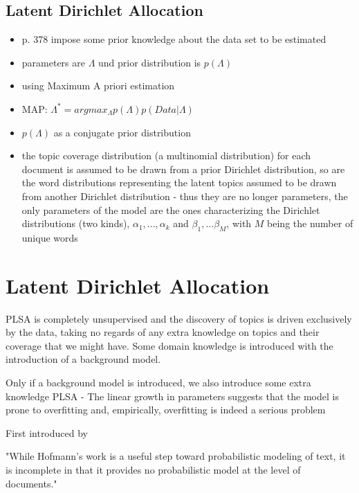\documentclass[11pt,a4paper,english,oneside]{book}
\numberwithin{equation}{chapter}
\begin{document}
\subsection{Latent Dirichlet Allocation}\label{LDA}

\begin{itemize}
	\item p. 378 impose some prior knowledge about the data set to be estimated
	\item parameters are $\Lambda$ und prior distribution is $p(\Lambda)$
	\item using Maximum A priori estimation
	\item MAP: $\Lambda^* = arg max_{\Lambda}p(\Lambda)p(Data|\Lambda)$
	\item $p(\Lambda)$ as a conjugate prior distribution
	\item the topic coverage distribution (a multinomial distribution) for each document is assumed to be drawn from a prior Dirichlet distribution, so are the word distributions representing the latent topics assumed to be drawn from another Dirichlet distribution - thus they are no longer parameters, the only parameters of the model are the ones characterizing the Dirichlet distributions (two kinds), $\alpha_1, ... , \alpha_k$ and $\beta_1, ... \beta_M$, with $M$ being the number of unique words
\end{itemize}



\section{Latent Dirichlet Allocation}
PLSA is completely unsupervised and the discovery of topics is driven exclusively by the data, taking no regards of any extra knowledge on topics and their coverage that we might have. Some domain knowledge is introduced with the introduction of a background model. 

 Only if a background model is introduced, we also introduce some extra knowledge 
PLSA - The linear growth in parameters suggests that the model is prone to overfitting and, empirically, overfitting is indeed a serious problem \cite[p. 1001]{Blei.2003}

First introduced by \cite{Blei.2003}

"While Hofmann’s work is a useful step toward probabilistic modeling of text, it is incomplete in that it provides no probabilistic model at the level of documents." \cite[p. 994]{Blei.2003}
\end{document}
